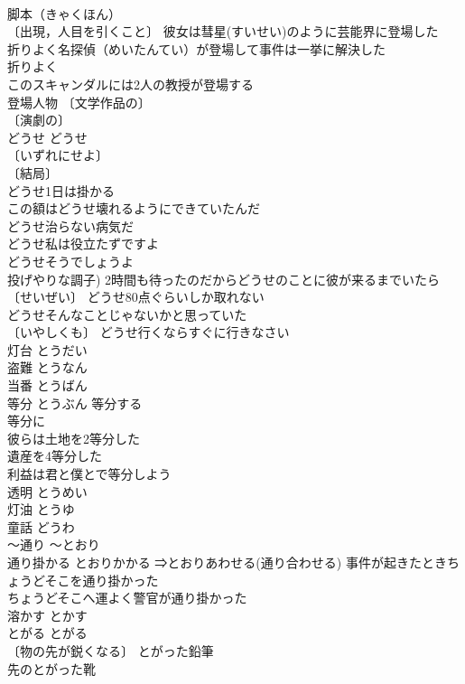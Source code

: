 \documentclass[8pt]{extreport}
\begin{document}
\begin{CJK}{UTF8}{min}
\\	脚本（きゃくほん）　
\\	〔出現，人目を引くこと〕 彼女は彗星(すいせい)のように芸能界に登場した 
\\	折りよく名探偵（めいたんてい）が登場して事件は一挙に解決した 
\\	折りよく　
\\	このスキャンダルには2人の教授が登場する 
\\	登場人物 〔文学作品の〕
\\	〔演劇の〕
\\	どうせ	どうせ	
\\	〔いずれにせよ〕
\\	〔結局〕
\\	どうせ1日は掛かる 
\\	この額はどうせ壊れるようにできていたんだ 
\\	どうせ治らない病気だ 
\\	どうせ私は役立たずですよ 
\\	どうせそうでしょうよ 
\\	投げやりな調子) 2時間も待ったのだからどうせのことに彼が来るまでいたら 
\\	〔せいぜい〕 どうせ80点ぐらいしか取れない 
\\	どうせそんなことじゃないかと思っていた 
\\	〔いやしくも〕 どうせ行くならすぐに行きなさい 
\\	灯台	とうだい	
\\	盗難	とうなん	
\\	当番	とうばん	
\\	等分	とうぶん	等分する 
\\	等分に 
\\	彼らは土地を2等分した 
\\	遺産を4等分した 
\\	利益は君と僕とで等分しよう 
\\	透明	とうめい	
\\	灯油	とうゆ	
\\	童話	どうわ	
\\	～通り	～とおり	
\\	通り掛かる	とおりかかる	⇒とおりあわせる(通り合わせる) 事件が起きたときちょうどそこを通り掛かった 
\\	ちょうどそこへ運よく警官が通り掛かった 
\\	溶かす	とかす	
\\	とがる	とがる	
\\	〔物の先が鋭くなる〕 とがった鉛筆 
\\	先のとがった靴 

\end{CJK}
\end{document}

